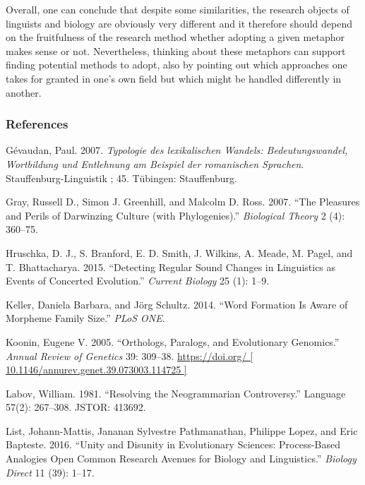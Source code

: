 \documentclass[
  a4paper,
  14pt,
  oneside,
  tablecaptionabove
]{scrbook}
\begin{document}
Overall, one can conclude that despite some similarities, the research
objects of linguists and biology are obviously very different and it
therefore should depend on the fruitfulness of the research method
whether adopting a given metaphor makes sense or not. Nevertheless,
thinking about these metaphors can support finding potential methods to
adopt, also by pointing out which approaches one takes for granted in
one's own field but which might be handled differently in another.

\subsubsection*{References}

\nopagebreak\hangindent=0.7cm {\small  Gévaudan, Paul. 2007. \emph{Typologie des
lexikalischen Wandels: Bedeutungswandel, Wortbildung und Entlehnung
am Beispiel der romanischen Sprachen}. Stauffenburg-Linguistik ; 45.
Tübingen: Stauffenburg. }

\nopagebreak\hangindent=0.7cm {\small  Gray, Russell D., Simon J. Greenhill, and Malcolm D. Ross. 2007.
\enquote{The Pleasures and Perils of Darwinzing Culture (with
Phylogenies).} \emph{Biological Theory} 2 (4): 360--75. }

\nopagebreak\hangindent=0.7cm {\small  Hruschka, D. J., S. Branford, E. D. Smith, J. Wilkins, A. Meade, M.
Pagel, and T. Bhattacharya. 2015. \enquote{Detecting Regular Sound
Changes in Linguistics as Events of Concerted Evolution.} \emph{Current
Biology} 25 (1): 1--9.}

\nopagebreak\hangindent=0.7cm {\small  Keller, Daniela Barbara, and Jörg Schultz. 2014. \enquote{Word
Formation Is Aware of Morpheme Family Size.} \emph{PLoS ONE}. }

\nopagebreak\hangindent=0.7cm {\small  Koonin, Eugene V. 2005. \enquote{Orthologs, Paralogs, and
Evolutionary Genomics.} \emph{Annual Review of Genetics} 39: 309--38.
\href{https://doi.org/10.1146/annurev.genet.39.073003.114725}{https://doi.org/
{[} 10.1146/annurev.genet.39.073003.114725 {]}} }

\nopagebreak\hangindent=0.7cm {\small  Labov, William. 1981. \enquote{Resolving the Neogrammarian
Controversy.} Language 57(2): 267--308. JSTOR: 413692. }

\nopagebreak\hangindent=0.7cm {\small  List, Johann-Mattis, Jananan Sylvestre Pathmanathan, Philippe Lopez,
and Eric Bapteste. 2016. \enquote{Unity and Disunity in Evolutionary
Sciences: Process-Based Analogies Open Common Research Avenues for
Biology and Linguistics.} \emph{Biology Direct} 11 (39): 1--17.}
\end{document}
